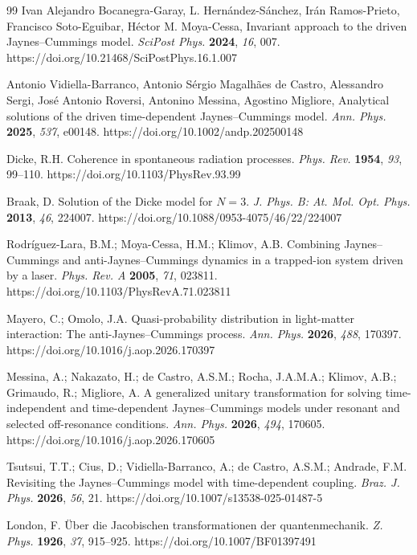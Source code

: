 \documentclass[10pt]{NSP1}
\begin{document}
\begin{thebibliography}{99}
Ivan Alejandro Bocanegra-Garay, L. Hernández-Sánchez, Irán Ramos-Prieto, Francisco Soto-Eguibar, Héctor M. Moya-Cessa, Invariant approach to the driven Jaynes--Cummings model. 
\textit{SciPost Phys.} \textbf{2024}, \textit{16}, 007.
https://doi.org/10.21468/SciPostPhys.16.1.007

Antonio Vidiella-Barranco, Antonio Sérgio Magalhães de Castro, Alessandro Sergi, José Antonio Roversi, Antonino Messina, Agostino Migliore, Analytical solutions of the driven time-dependent Jaynes--Cummings model. 
\textit{Ann. Phys.} \textbf{2025}, \textit{537}, e00148.
https://doi.org/10.1002/andp.202500148

Dicke, R.H. Coherence in spontaneous radiation processes. 
\textit{Phys. Rev.} \textbf{1954}, \textit{93}, 99--110.
https://doi.org/10.1103/PhysRev.93.99

Braak, D. Solution of the Dicke model for $N=3$. 
\textit{J. Phys. B: At. Mol. Opt. Phys.} \textbf{2013}, \textit{46}, 224007.
https://doi.org/10.1088/0953-4075/46/22/224007


Rodr\'{i}guez-Lara, B.M.; Moya-Cessa, H.M.; Klimov, A.B. Combining Jaynes--Cummings and anti-Jaynes--Cummings dynamics in a trapped-ion system driven by a laser. 
\textit{Phys. Rev. A} \textbf{2005}, \textit{71}, 023811.
https://doi.org/10.1103/PhysRevA.71.023811

Mayero, C.; Omolo, J.A. Quasi-probability distribution in light-matter interaction: The anti-Jaynes--Cummings process. 
\textit{Ann. Phys.} \textbf{2026}, \textit{488}, 170397.
https://doi.org/10.1016/j.aop.2026.170397

Messina, A.; Nakazato, H.; de Castro, A.S.M.; Rocha, J.A.M.A.; Klimov, A.B.; Grimaudo, R.; Migliore, A. A generalized unitary transformation for solving time-independent and time-dependent Jaynes--Cummings models under resonant and selected off-resonance conditions. 
\textit{Ann. Phys.} \textbf{2026}, \textit{494}, 170605.
https://doi.org/10.1016/j.aop.2026.170605

Tsutsui, T.T.; Cius, D.; Vidiella-Barranco, A.; de Castro, A.S.M.; Andrade, F.M. Revisiting the Jaynes--Cummings model with time-dependent coupling. 
\textit{Braz. J. Phys.} \textbf{2026}, \textit{56}, 21.
https://doi.org/10.1007/s13538-025-01487-5


London, F. \"{U}ber die Jacobischen transformationen der quantenmechanik. 
\textit{Z. Phys.} \textbf{1926}, \textit{37}, 915--925.
https://doi.org/10.1007/BF01397491


\end{thebibliography}
\end{document}
